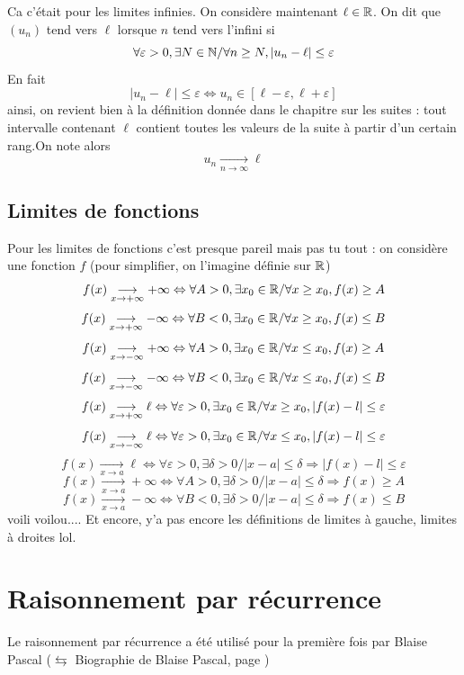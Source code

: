 Ca c'était pour les limites infinies. On considère maintenant $\ell \in \mathbb{R}$. On dit que $(u_n)$ tend vers $\ell$ lorsque $n$ tend vers l'infini si 
$$\forall \varepsilon > 0, \exists N \in \mathbb{N} / \forall n\geq N, |u_n - \ell| \leq \varepsilon$$
En fait 
$$|u_n - \ell|\leq \varepsilon \Leftrightarrow u_n \in [\ell-\varepsilon,\ell+\varepsilon]$$ 
ainsi, on revient bien à la définition donnée dans le chapitre sur les suites : tout intervalle contenant $\ell$ contient toutes les valeurs de la suite à partir d'un certain rang.On note alors $$u_n \underset{n\rightarrow \infty}{\longrightarrow} \ell$$ 
\section{Limites de fonctions}
Pour les limites de fonctions c'est presque pareil mais pas tu tout : on considère une fonction $f$ (pour simplifier, on l'imagine définie sur $\mathbb{R}$)
$$f(x) \underset{x\rightarrow +\infty}{\longrightarrow} +\infty \Leftrightarrow \forall A > 0,\exists x_0 \in \mathbb{R}/ \forall x \geq x_0, f(x) \geq A$$ 
$$f(x) \underset{x\rightarrow +\infty}{\longrightarrow} -\infty \Leftrightarrow \forall B < 0,\exists x_0 \in \mathbb{R}/ \forall x \geq x_0, f(x) \leq B$$ 
$$f(x) \underset{x\rightarrow -\infty}{\longrightarrow} +\infty \Leftrightarrow \forall A > 0,\exists x_0 \in \mathbb{R}/ \forall x \leq x_0, f(x) \geq A$$ 
$$f(x) \underset{x\rightarrow -\infty}{\longrightarrow} -\infty \Leftrightarrow \forall B < 0,\exists x_0 \in \mathbb{R}/ \forall x \leq x_0, f(x) \leq B$$ 
$$f(x) \underset{x\rightarrow +\infty}{\longrightarrow} \ell \Leftrightarrow \forall \varepsilon > 0,\exists x_0 \in \mathbb{R}/ \forall x \geq x_0, |f(x)-l| \leq \varepsilon$$ 
$$f(x) \underset{x\rightarrow -\infty}{\longrightarrow} \ell \Leftrightarrow \forall \varepsilon > 0,\exists x_0 \in \mathbb{R}/ \forall x \leq x_0, |f(x)-l| \leq \varepsilon$$ 
$$f(x) \underset{x\rightarrow a}{\longrightarrow} \ell \Leftrightarrow \forall \varepsilon > 0,\exists \delta > 0/ |x-a| \leq \delta \Rightarrow |f(x)-l| \leq \varepsilon$$ 
$$f(x) \underset{x\rightarrow a}{\longrightarrow} +\infty \Leftrightarrow \forall A > 0,\exists \delta > 0/ |x-a| \leq \delta \Rightarrow f(x) \geq A$$ 
$$f(x) \underset{x\rightarrow a}{\longrightarrow} -\infty \Leftrightarrow \forall B < 0,\exists \delta > 0/ |x-a| \leq \delta \Rightarrow f(x) \leq B$$ 
voili voilou.... Et encore, y'a pas encore les définitions de limites à gauche, limites à droites lol.
\chapter{Raisonnement par récurrence}
\label{chap:recurrence}
Le raisonnement par récurrence a été utilisé pour la première fois par Blaise Pascal ($\leftrightarrows$ Biographie de Blaise Pascal, page \pageref{bio:pascal})\newline

